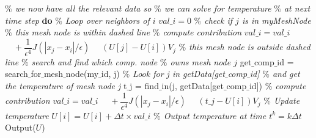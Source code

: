 \documentclass[11pt,twocolumn]{amsart}
\theoremstyle{definition}
\theoremstyle{definition}
\numberwithin{equation}{section}
\numberwithin{equation}{section}
\begin{document}
\begin{algorithm}
	\begin{algorithmic}[1]
			\STATE \textcolor{mygray}{\it $\%$ we now have all the relevant data so}
			\STATE \textcolor{mygray}{\it $\%$ we can solve for temperature}
			\STATE \textcolor{mygray}{\it $\%$ at next time step}
			 \textbf{do}
				\STATE \textcolor{mygray}{\it $\%$ Loop over neighbors of $i$}
				\STATE $val\_i = 0$
					\STATE \textcolor{mygray}{\it $\%$ check if $j$ is in myMeshNode}
						\STATE \textcolor{mygray}{\it $\%$ this mesh node is within dashed line}
						\STATE
						\STATE \textcolor{mygray}{\it $\%$ compute contribution}
						\STATE $val\_i = val\_i $
						\STATE $\quad +  \dfrac{1}{\epsilon^4} J(|x_j - x_i|/\epsilon)$
						\STATE $\quad (U[j] - U[i])V_j$
					\ELSE 
						\STATE \textcolor{mygray}{\it $\%$ this mesh node is outside dashed line}
						\STATE \textcolor{mygray}{\it $\%$ search and find which comp. node }
						\STATE \textcolor{mygray}{\it $\%$ owns mesh node $j$}
						\STATE get$\_$comp$\_$id = 
						\STATE \; search$\_$for$\_$mesh$\_$node(my$\_$id, j)
						\STATE
						\STATE \textcolor{mygray}{\it $\%$ Look for j in getData[get$\_$comp$\_$id]}
						\STATE \textcolor{mygray}{\it $\%$ and get the temperature of mesh node j}			
						\STATE t$\_$j = find$\_$in(j, getData[get$\_$comp$\_$id])
						\STATE
						\STATE \textcolor{mygray}{\it $\%$ compute contribution}
						\STATE $val\_i = val\_i $
						\STATE $\quad +  \dfrac{1}{\epsilon^4} J(|x_j - x_i|/\epsilon)$
						\STATE $\quad (t\_j - U[i])V_j$	
					\ENDIF
				\ENDFOR
				\STATE \textcolor{mygray}{\it $\%$ Update temperature}
				\STATE $U[i] = U[i] + \Delta t \times val\_i$
			\EndHloop	
			\STATE \textcolor{mygray}{\it $\%$ Output temperature at time $t^k = k\Delta t$}
			\STATE Output($U$)
		\ENDFOR
	\end{algorithmic}
\end{algorithm}
\end{document}
